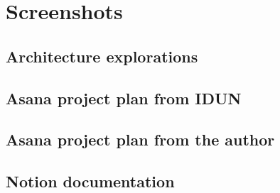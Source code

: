 \chapter{Screenshots}
\label{appendix4-screenshots}

\section*{Architecture explorations}

\section*{Asana project plan from IDUN}

\section*{Asana project plan from the author}

\section*{Notion documentation}